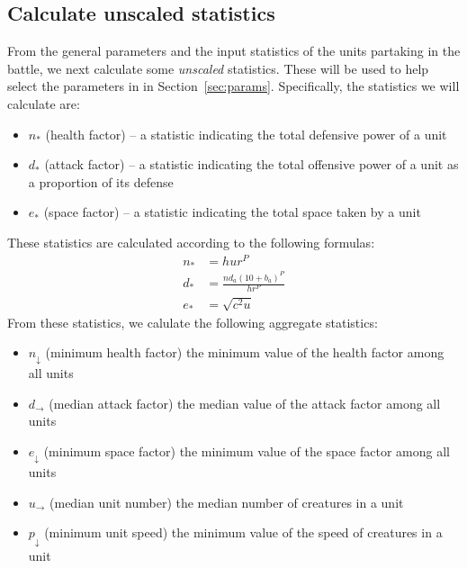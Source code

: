 \subsection{Calculate unscaled statistics}\label{sec:calculate-unscaled}

From the general parameters and the input statistics of the units
partaking in the battle,
we next calculate some \emph{unscaled} statistics.
These will be used to help select the parameters in in Section~\ref{sec:params}.
Specifically, the statistics we will calculate are:
%
\begin{itemize}
    \item $n_*$ (health factor) -- a statistic indicating the total defensive power of a unit
    \item $d_*$ (attack factor) -- a statistic indicating the total offensive power of a unit as a proportion of its defense
    \item $e_*$ (space factor) -- a statistic indicating the total space taken by a unit
\end{itemize}
%

These statistics are calculated according to the following formulas:
%
\begin{align*}
    n_* &= hur^P \\
    d_* &= \frac{
        n d_a (10 + b_a)^P
    }{
        h r^P
    } \\
    e_* &= \sqrt{c^2 u}
\end{align*}
%
From these statistics, we calulate the following aggregate statistics:
%
\begin{itemize}
    \item $n_\downarrow$ (minimum health factor) the minimum value of the health factor among all units
    \item $d_\rightarrow$ (median attack factor) the median value of the attack factor among all units
    \item $e_\downarrow$ (minimum space factor) the minimum value of the space factor among all units
    \item $u_\rightarrow$ (median unit number) the median number of creatures in a unit
    \item $p_\downarrow$ (minimum unit speed) the minimum value of the speed of creatures in a unit
\end{itemize}
